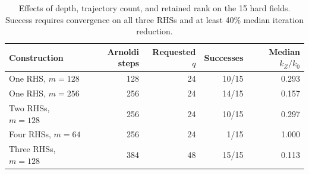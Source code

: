 \begin{table}[htbp]
\centering
\caption{Effects of depth, trajectory count, and retained rank on the 15 hard fields. Success requires convergence on all three RHSs and at least 40\% median iteration reduction.}
\label{tab:oracle-depth-union}
\small
\begin{tabular}{lrrrr}
\toprule
Construction & Arnoldi steps & Requested $q$ & Successes & Median $k_Z/k_0$\\
\midrule
One RHS, $m=128$ & 128 & 24 & 10/15 & 0.293\\
One RHS, $m=256$ & 256 & 24 & 14/15 & 0.157\\
Two RHSs, $m=128$ & 256 & 24 & 10/15 & 0.297\\
Four RHSs, $m=64$ & 256 & 24 & 1/15 & 1.000\\
Three RHSs, $m=128$ & 384 & 48 & 15/15 & 0.113\\
\bottomrule
\end{tabular}
\end{table}
